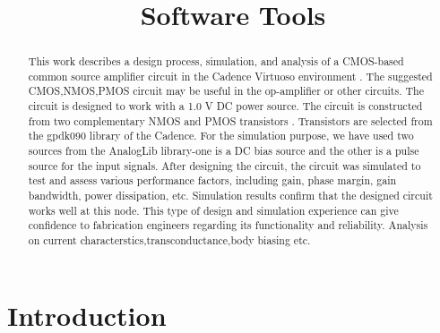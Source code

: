 \documentclass[conference]{IEEEtran}
\begin{document}
\title{Software Tools
}

\author{
}

\maketitle

\begin{abstract}
This work describes a design process, simulation, and analysis of a CMOS-based common source amplifier circuit in the Cadence Virtuoso environment . The suggested CMOS,NMOS,PMOS circuit may be useful in the op-amplifier or other circuits. The circuit is designed to work with a 1.0 V DC power source. The circuit is constructed from two complementary NMOS and PMOS transistors .  Transistors are selected from the gpdk090 library of the Cadence. For the simulation purpose, we have used two sources from the AnalogLib library-one is a DC bias source and the other is a pulse source for the input signals. After designing the circuit, the circuit was simulated to test and assess various performance factors, including gain, phase margin, gain bandwidth, power dissipation, etc. Simulation results confirm that the designed circuit works well at this node. This type of design and simulation experience can give confidence to fabrication engineers regarding its functionality and reliability. Analysis on current characterstics,transconductance,body biasing etc.
\end{abstract}

\section{Introduction}
\end{document}
